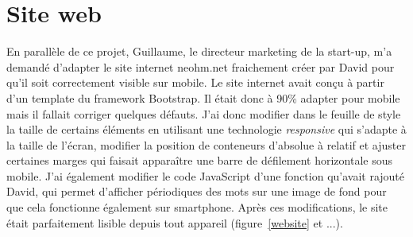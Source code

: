 \documentclass[a4paper, 11pt]{report}
\begin{document}
\section{Site web}
En parallèle de ce projet, Guillaume, le directeur marketing de la start-up, m’a demandé d’adapter le site internet neohm.net fraichement créer par David pour qu’il soit correctement visible sur mobile.
Le site internet avait conçu à partir d’un template du framework Bootstrap. Il était donc à 90\% adapter pour mobile mais il fallait corriger quelques défauts. J’ai donc modifier dans le feuille de style la taille de certains éléments en utilisant une technologie \emph{responsive} qui s’adapte à la taille de l’écran, modifier la position de conteneurs d’absolue à relatif et ajuster certaines marges qui faisait apparaître une barre de défilement horizontale sous mobile. J’ai également modifier le code JavaScript d’une fonction qu’avait rajouté David, qui permet d’afficher périodiques des mots sur une image de fond pour que cela fonctionne également sur smartphone. Après ces modifications, le site était parfaitement lisible depuis tout appareil (figure~\ref{website} et ...).
\end{document}
